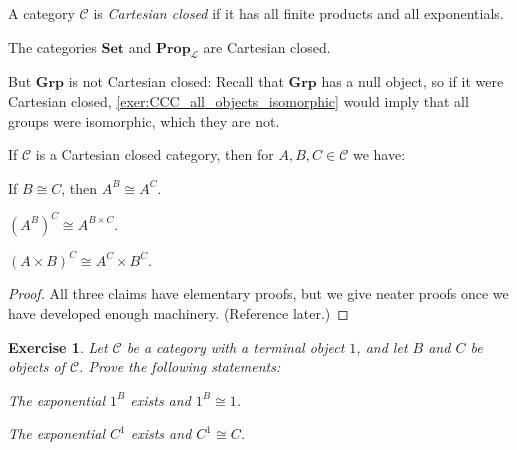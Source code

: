 \documentclass[article, a4paper, 11pt, oneside]{memoir}
\numberwithin{equation}{chapter}
\newcommand{\calL}{\mathcal{L}}
\newcommand{\cat}[1]{\mathcal{#1}}
\newcommand{\ncat}[1]{\mathbf{#1}} %
\newcommand{\catSet}{\ncat{Set}}
\newcommand{\catGrp}{\ncat{Grp}}
\newcommand{\catProp}{\ncat{Prop}}
\newcommand{\catC}{\cat{C}}
\theoremstyle{myexample}
\newtheorem{exercise}[theorem]{Exercise}
\theoremstyle{myexamplebreak}
\begin{document}
\begin{definition}
    A category $\catC$ is \emph{Cartesian closed} if it has all finite products and all exponentials.
\end{definition}


\begin{examplebreak}
    \begin{enumexample}
        \item The categories $\catSet$ and $\catProp_\calL$ are Cartesian closed.

        \item But $\catGrp$ is not Cartesian closed: Recall that $\catGrp$ has a null object, so if it were Cartesian closed, \cref{exer:CCC_all_objects_isomorphic} would imply that all groups were isomorphic, which they are not.
    \end{enumexample}
\end{examplebreak}


\begin{theorem}
    If $\catC$ is a Cartesian closed category, then for $A,B,C \in \catC$ we have:
    \begin{enumthm}
        \item If $B \cong C$, then $A^B \cong A^C$.
        
        \item $(A^B)^C \cong A^{B \times C}$.
        
        \item $(A \times B)^C \cong A^C \times B^C$.
    \end{enumthm}
\end{theorem}

\begin{proof}
    All three claims have elementary proofs, but we give neater proofs once we have developed enough machinery. (Reference later.)
\end{proof}


\begin{exercise}
    Let $\catC$ be a category with a terminal object $1$, and let $B$ and $C$ be objects of $\catC$. Prove the following statements:
    \begin{enumexercise}
        \item The exponential $1^B$ exists and $1^B \cong 1$.

        \item The exponential $C^1$ exists and $C^1 \cong C$.
    \end{enumexercise}
\end{exercise}
\end{document}
